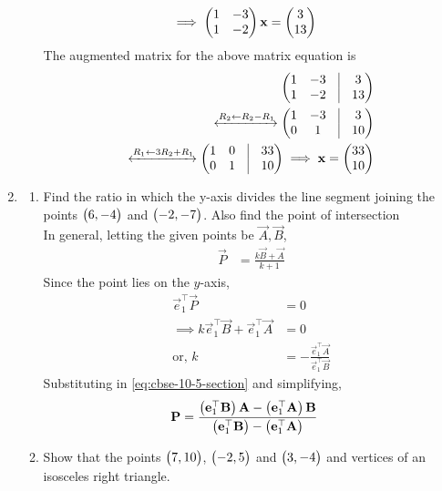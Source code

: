 \documentclass[journal,12pt,twocolumn]{IEEEtran}
\begin{document}
\begin{enumerate}[label=4.\arabic*]
\begin{enumerate}
\begin{align}
			    \implies 
			    \begin{pmatrix}1 &  -3
			    \\
			    1 & -2\end{pmatrix}\mathbf{x} &= \begin{pmatrix}3 \\ 13\end{pmatrix}
		    \end{align}
		    The augmented matrix for the above matrix equation is 
		    \begin{align}
			    \myvec{
				    1 & -3 & \vrule & 3
			    \\
			    1 & -2  &\vrule & 13
		    }
		    \\
		    \xleftrightarrow[]{R_2 \leftarrow R_2 -R_1 }
			    \myvec{
				    1 & -3 & \vrule & 3
			    \\
			    0 & 1  &\vrule & 10
		    }
		    \\
		    \xleftrightarrow[]{R_1 \leftarrow 3R_2 +R_1 }
			    \myvec{
				    1 & 0 & \vrule & 33
			    \\
			    0 & 1  &\vrule & 10
		    }
			    \implies \vec{x} = \myvec{33 \\ 10}
		    \end{align}
    \end{enumerate} 
    \item \begin{enumerate}
        \item Find the ratio in which the y-axis divides the line segment joining the points $\begin{pmatrix}6, -4\end{pmatrix}$ and $\begin{pmatrix}-2, -7\end{pmatrix}$. Also find the point of intersection\\
\solution  In general, letting the given points be $\vec{A}, \vec{B}$, 
		\begin{align}
			\vec{P} &= \frac{k\vec{B}+ \vec{A} }{k+1}
			\label{eq:cbse-10-5-section}
		\end{align}
		Since the point lies on the $y$-axis, 
		\begin{align}
			\vec{e}_1^{\top}\vec{P} &= 0
			\\
			\implies k\vec{e}_1^{\top}\vec{B}+ \vec{e}_1^{\top}\vec{A} &=0
			\\
			\text{or, } k &=- \frac{\vec{e}_1^{\top}\vec{A}}{\vec{e}_1^{\top}\vec{B}}
		\end{align}
Substituting in 			\eqref{eq:cbse-10-5-section} and simplifying, 
		\begin{align}
			\mathbf{P} &= \frac{\left(\mathbf{e}_1^{\top}\mathbf{B}\right)\mathbf{A}- \left(\mathbf{e}_1^{\top}\mathbf{A}\right)\mathbf{B} }{\left(\mathbf{e}_1^{\top}\mathbf{B}\right)-\left(\mathbf{e}_1^{\top}\mathbf{A}\right)}
		\end{align}
        \item Show that the points $\begin{pmatrix}7, 10\end{pmatrix}$, $\begin{pmatrix}-2,5\end{pmatrix}$ and $\begin{pmatrix}3, -4\end{pmatrix}$ and vertices of an isosceles right triangle.

\end{enumerate}
\end{enumerate}
\end{document}
